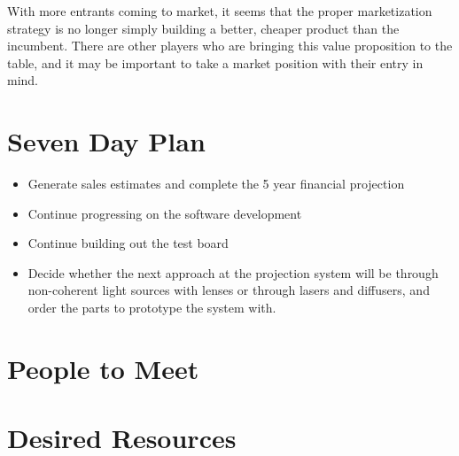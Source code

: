 \documentclass[10pt]{article}
\begin{document}
With more entrants coming to market, it seems that the proper marketization
strategy is no longer simply building a better, cheaper product than the
incumbent.  There are other players who are bringing this value proposition to
the table, and it may be important to take a market position with their entry in mind.

\section{Seven Day Plan}
\begin{itemize}
\item Generate sales estimates and complete the 5 year financial projection
\item Continue progressing on the software development
\item Continue building out the test board
\item Decide whether the next approach at the projection system will be through
  non-coherent light sources with lenses or through lasers and diffusers, and
  order the parts to prototype the system with.
\end{itemize}

\section{People to Meet}

\section{Desired Resources}
\end{document}
